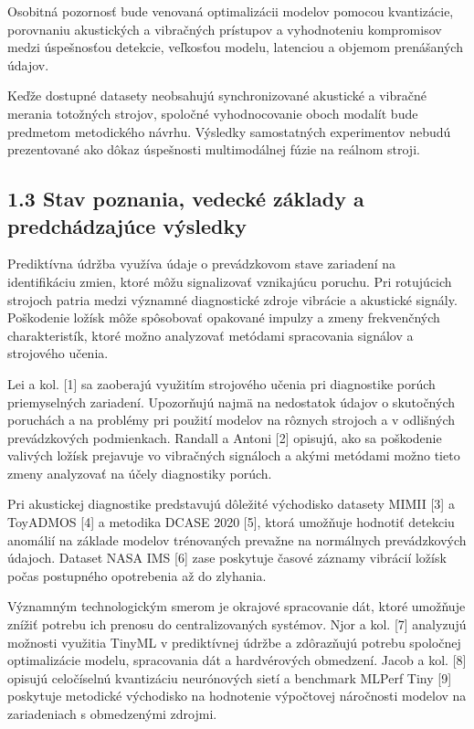 \documentclass[10pt,a4paper]{article}
\begin{document}
Osobitná pozornosť bude venovaná optimalizácii modelov pomocou kvantizácie, porovnaniu akustických a vibračných prístupov a vyhodnoteniu kompromisov medzi úspešnosťou detekcie, veľkosťou modelu, latenciou a objemom prenášaných údajov.

Keďže dostupné datasety neobsahujú synchronizované akustické a vibračné merania totožných strojov, spoločné vyhodnocovanie oboch modalít bude predmetom metodického návrhu. Výsledky samostatných experimentov nebudú prezentované ako dôkaz úspešnosti multimodálnej fúzie na reálnom stroji.

\subsection*{1.3 Stav poznania, vedecké základy
a predchádzajúce výsledky}

Prediktívna údržba využíva údaje o prevádzkovom stave zariadení na identifikáciu zmien, ktoré môžu signalizovať vznikajúcu poruchu. Pri rotujúcich strojoch patria medzi významné diagnostické zdroje vibrácie a akustické signály. Poškodenie ložísk môže spôsobovať opakované impulzy a zmeny frekvenčných charakteristík, ktoré možno analyzovať metódami spracovania signálov a strojového učenia.

Lei a kol. [1] sa zaoberajú využitím strojového učenia pri diagnostike porúch priemyselných zariadení. Upozorňujú najmä na nedostatok údajov o skutočných poruchách a na problémy pri použití modelov na rôznych strojoch a v odlišných prevádzkových podmienkach. Randall a Antoni [2] opisujú, ako sa poškodenie valivých ložísk prejavuje vo vibračných signáloch a akými metódami možno tieto zmeny analyzovať na účely diagnostiky porúch.

Pri akustickej diagnostike predstavujú dôležité východisko datasety MIMII [3] a ToyADMOS [4] a metodika DCASE 2020 [5], ktorá umožňuje hodnotiť detekciu anomálií na základe modelov trénovaných prevažne na normálnych prevádzkových údajoch. Dataset NASA IMS [6] zase poskytuje časové záznamy vibrácií ložísk počas postupného opotrebenia až do zlyhania.

Významným technologickým smerom je okrajové spracovanie dát, ktoré umožňuje znížiť potrebu ich prenosu do centralizovaných systémov. Njor a kol. [7] analyzujú možnosti využitia TinyML v prediktívnej údržbe a zdôrazňujú potrebu spoločnej optimalizácie modelu, spracovania dát a hardvérových obmedzení. Jacob a kol. [8] opisujú celočíselnú kvantizáciu neurónových sietí a benchmark MLPerf Tiny [9] poskytuje metodické východisko na hodnotenie výpočtovej náročnosti modelov na zariadeniach s obmedzenými zdrojmi.
\end{document}
